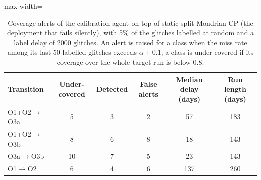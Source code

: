 \begin{table}[!htb]
\caption{Coverage alerts of the calibration agent on top of static split Mondrian CP (the deployment that fails silently), with 5\%
of the glitches labelled at random and a label delay of 2000 glitches. An alert is raised for a class when the miss rate among its last
50 labelled glitches exceeds $\alpha+0.1$; a class is under-covered if its coverage over the whole target run is below 0.8.}\label{tab:e9alerts}
\centering\scriptsize\setlength{\tabcolsep}{4pt}
\begin{adjustbox}{max width=\columnwidth}\begin{tabular}{lccccc}\toprule
Transition & Under-covered & Detected & False alerts & Median delay (days) & Run length (days)\\\midrule
O1+O2$\rightarrow$O3a & 5 & 3 & 2 & 57 & 183\\
O1+O2$\rightarrow$O3b & 8 & 6 & 8 & 18 & 143\\
O3a$\rightarrow$O3b & 10 & 7 & 5 & 23 & 143\\
O1$\rightarrow$O2 & 6 & 4 & 6 & 137 & 260\\
\bottomrule
\end{tabular}\end{adjustbox}
\end{table}
